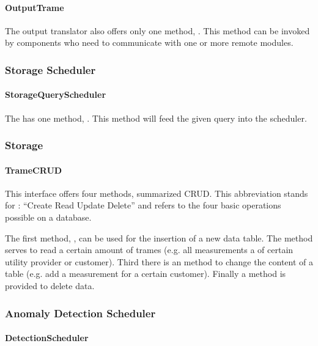 \paragraph{OutputTrame}

\npar The output translator also offers only one method, .
This method can be invoked by components who need to communicate with one or
more remote modules.

\subsubsection{Storage Scheduler}

\paragraph{StorageQueryScheduler}

\npar The  has one method,
. This method will feed the given query into the
scheduler. 

\subsubsection{Storage}

\paragraph{TrameCRUD}

\npar This interface offers four methods, summarized CRUD. This abbreviation
stands for : ``Create Read Update Delete'' and refers to the four basic
operations possible on a database.
 
\npar The first method, , can be used for the insertion of
a new data table. The  method serves to read a certain
amount of trames (e.g. all measurements a of certain utility provider or
customer). Third there is an  method to change the
content of a table (e.g. add a measurement for a certain customer). Finally a
 method is provided to delete data.

\subsubsection{Anomaly Detection Scheduler}

\paragraph{DetectionScheduler}

